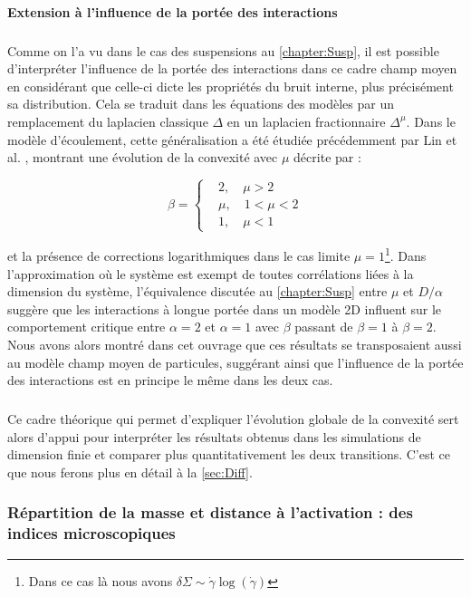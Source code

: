 \paragraph{Extension à l'influence de la portée des interactions}

\subparagraph{}Comme on l'a vu dans le cas des suspensions au \autoref{chapter:Susp}, il est possible d’interpréter l'influence de la portée des interactions dans ce cadre champ moyen en considérant que celle-ci dicte les propriétés du bruit interne, plus précisément sa distribution. Cela se traduit dans les équations des modèles par un remplacement du laplacien classique $\Delta$ en un laplacien fractionnaire $\Delta^\mu$. Dans le modèle d'écoulement, cette généralisation a été étudiée précédemment par Lin et al. \cite{lin_mean-field_2016, lin_microscopic_2018}, montrant une évolution de la convexité avec $\mu$ décrite par :

\begin{equation}
	\beta = \left\{
	\begin{aligned}
	&2, \quad \mu > 2\\
	&\mu, \quad 1<\mu<2\\
	&1, \quad \mu < 1
	\end{aligned}
	\right.
\end{equation}

\noindent et la présence de corrections logarithmiques dans le cas limite $\mu = 1$\footnote{Dans ce cas là nous avons $\delta\Sigma \sim \dot{\gamma}\log(\dot{\gamma})$}. Dans l'approximation où le système est exempt de toutes corrélations liées à la dimension du système, l'équivalence discutée au \autoref{chapter:Susp} entre $\mu$ et $D/\alpha$ suggère que les interactions à longue portée dans un modèle 2D influent sur le comportement critique entre $\alpha = 2$ et $\alpha = 1$ avec $\beta$ passant de $\beta = 1$ à $\beta = 2$. Nous avons alors montré dans cet ouvrage que ces résultats se transposaient aussi au modèle champ moyen de particules, suggérant ainsi que l'influence de la portée des interactions est en principe le même dans les deux cas.

\subparagraph{}Ce cadre théorique qui permet d'expliquer l'évolution globale de la convexité sert alors d'appui pour interpréter les résultats obtenus dans les simulations de dimension finie et comparer plus quantitativement les deux transitions. C'est ce que nous ferons plus en détail à la \autoref{sec:Diff}.

\subsubsection{Répartition de la masse et distance à l'activation : des indices microscopiques}

